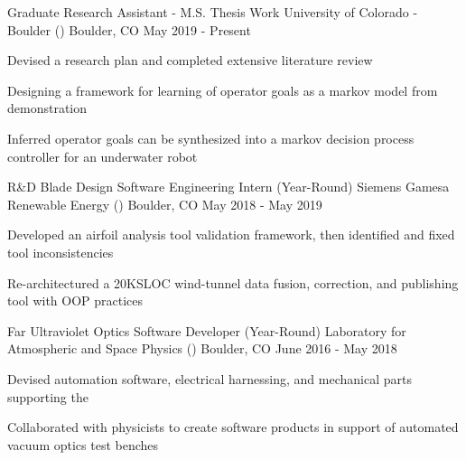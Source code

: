 \begin{cventries}
  \cventry
    {Graduate Research Assistant - M.S. Thesis Work}
    {University of Colorado - Boulder ()}
    {Boulder, CO}
    {May 2019 - Present}
    {
      \begin{cvitems}
        \item {Devised a research plan and completed extensive literature review}
        \item {Designing a framework for learning of operator goals as a markov model from demonstration}
        \item {Inferred operator goals can be synthesized into a markov decision process controller for an underwater robot}
      \end{cvitems}
    }
    \cventry
    {R\&D Blade Design Software Engineering Intern (Year-Round)}
    {Siemens Gamesa Renewable Energy ()}
    {Boulder, CO}
    {May 2018 - May 2019}
    {
      \begin{cvitems}
        \item {Developed an airfoil analysis tool validation framework, then identified and fixed tool inconsistencies}
        \item {Re-architectured a 20KSLOC wind-tunnel data fusion, correction, and publishing tool with OOP practices}
      \end{cvitems}
    }

  \cventry
    {Far Ultraviolet Optics Software Developer (Year-Round)}
    {Laboratory for Atmospheric and Space Physics () }
    {Boulder, CO}
    {June 2016 - May 2018}
    {
      \begin{cvitems}
        \item {Devised automation software, electrical harnessing, and mechanical parts supporting the }
        \item {Collaborated with physicists to create software products in support of automated vacuum optics test benches}
      \end{cvitems}
    }
\end{cventries}
